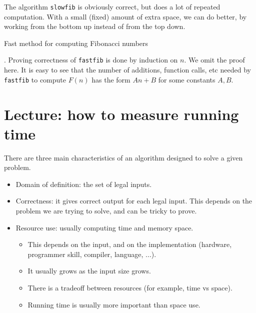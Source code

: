 The algorithm \texttt{slowfib} is obviously correct, but does a lot of 
repeated computation. With a small (fixed) amount of extra space, we can do better, by 
working from the bottom up instead of from the top down.

\begin{algorithm}[H]
  \caption{Fast method for computing Fibonacci numbers
    \label{alg:fastfib}}
\begin{algorithmic}[1]
\Else
{} 
  
\EndFor
\EndIf
\State {}
\EndFunction
\end{algorithmic}
\end{algorithm}
\fi
. 
Proving correctness of \texttt{fastfib} is done by induction on $n$.  We omit the proof here.
It is easy to see that the number of additions, function calls, etc needed by 
\texttt{fastfib} to compute $F(n)$ has the form $An+B$ for some constants 
$A, B$.

\chapter{Lecture: how to measure running time}


There are three main characteristics of an algorithm designed to solve a given 
problem.
\begin{itemize}
\item Domain of definition: the set of legal inputs. 
\item Correctness: it gives correct output for each legal input. 
This depends on the problem we are trying to solve, and can be tricky to 
prove. 
\item Resource use: usually computing time and memory space. 
\begin{itemize} 
\item This depends on the input, and on the implementation 
(hardware, programmer skill, compiler, language, ...). 
\item It usually grows as the input size grows. 
\item There is a tradeoff between resources (for example, time vs space). 
\item Running time is usually more important than space use. 
\end{itemize}
\end{itemize}

